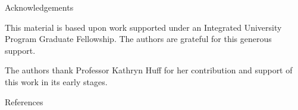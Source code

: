 \documentclass[final]{beamer}
\newlength{\onecolwid}
\newlength{\threecolwid}
\begin{document}
\begin{frame}[t]
\begin{columns}[t,totalwidth=\threecolwid]
\begin{column}{\onecolwid}

\begin{block}{Acknowledgements}

	This material is based upon work supported under an Integrated University Program Graduate Fellowship. The authors are grateful for this generous support.

The authors thank Professor Kathryn Huff for her contribution and support of this work in its early stages.
	
\end{block}



\begin{block}{References}

	{\footnotesize 
	}
\end{block}





\end{column} %

\end{columns} %

\end{frame} %
\end{document}
